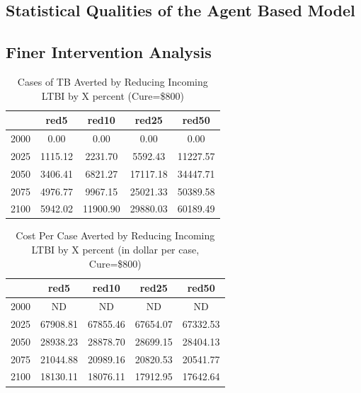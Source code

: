 \documentclass{amsart}
\begin{document}
\subsection{Statistical Qualities of the Agent Based Model}
\subsection{Finer Intervention Analysis}

\begin{table}
\centering
\begin{tabular}{|r|cccc|}
  \hline
 & red5 & red10 & red25 & red50 \\ 
  \hline
2000 & 0.00 & 0.00 & 0.00 & 0.00 \\ 
  2025 & 1115.12 & 2231.70 & 5592.43 & 11227.57 \\ 
  2050 & 3406.41 & 6821.27 & 17117.18 & 34447.71 \\ 
  2075 & 4976.77 & 9967.15 & 25021.33 & 50389.58 \\ 
  2100 & 5942.02 & 11900.90 & 29880.03 & 60189.49 \\ 
   \hline
\end{tabular}
\caption{Cases of TB Averted by Reducing Incoming LTBI by X percent (Cure=\$800)} 
\label{tab:caRed}
\end{table}

\begin{table}
\centering
\begin{tabular}{|r|cccc|}
  \hline
 & red5 & red10 & red25 & red50 \\ 
  \hline
2000 & ND & ND & ND & ND \\ 
  2025 & 67908.81 & 67855.46 & 67654.07 & 67332.53 \\ 
  2050 & 28938.23 & 28878.70 & 28699.15 & 28404.13 \\ 
  2075 & 21044.88 & 20989.16 & 20820.53 & 20541.77 \\ 
  2100 & 18130.11 & 18076.11 & 17912.95 & 17642.64 \\ 
   \hline
\end{tabular}
\caption{Cost Per Case Averted by Reducing Incoming LTBI by X percent (in dollar per case, Cure=\$800)} 
\label{tab:cpcaRed}
\end{table}
\end{document}
